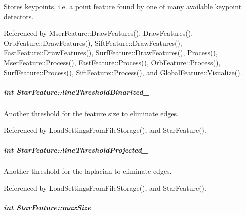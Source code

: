Stores keypoints, i.\-e. a point feature found by one of many available keypoint detectors. 



Referenced by Mser\-Feature\-::\-Draw\-Features(), Draw\-Features(), Orb\-Feature\-::\-Draw\-Features(), Sift\-Feature\-::\-Draw\-Features(), Fast\-Feature\-::\-Draw\-Features(), Surf\-Feature\-::\-Draw\-Features(), Process(), Mser\-Feature\-::\-Process(), Fast\-Feature\-::\-Process(), Orb\-Feature\-::\-Process(), Surf\-Feature\-::\-Process(), Sift\-Feature\-::\-Process(), and Global\-Feature\-::\-Visualize().

\hypertarget{group___feature_extractor_aea296c8f5cdf67ae340aac32f9512906}{
\subparagraph[{line\-Threshold\-Binarized\-\_\-}]{\setlength{\rightskip}{0pt plus 5cm}int Star\-Feature\-::line\-Threshold\-Binarized\-\_\-\hspace{0.3cm}{\ttfamily [private]}}}\label{group___feature_extractor_aea296c8f5cdf67ae340aac32f9512906}


Another threshold for the feature size to eliminate edges. 



Referenced by Load\-Settings\-From\-File\-Storage(), and Star\-Feature().

\hypertarget{group___feature_extractor_ab01cd66c7c27def6dcf03915c83085ad}{
\subparagraph[{line\-Threshold\-Projected\-\_\-}]{\setlength{\rightskip}{0pt plus 5cm}int Star\-Feature\-::line\-Threshold\-Projected\-\_\-\hspace{0.3cm}{\ttfamily [private]}}}\label{group___feature_extractor_ab01cd66c7c27def6dcf03915c83085ad}


Another threshold for the laplacian to eliminate edges. 



Referenced by Load\-Settings\-From\-File\-Storage(), and Star\-Feature().

\hypertarget{group___feature_extractor_a03553a6b73fb075fa1bc1813b91b2079}{
\subparagraph[{max\-Size\-\_\-}]{\setlength{\rightskip}{0pt plus 5cm}int Star\-Feature\-::max\-Size\-\_\-\hspace{0.3cm}{\ttfamily [private]}}}\label{group___feature_extractor_a03553a6b73fb075fa1bc1813b91b2079}


